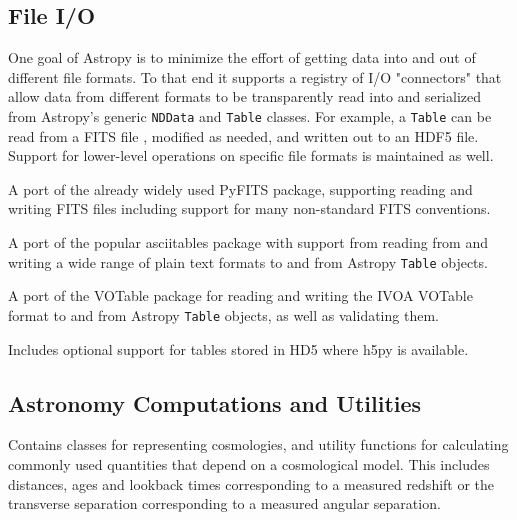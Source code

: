 \documentclass[11pt,twoside]{article}
\begin{document}
\subsection{File I/O}

One goal of Astropy is to minimize the effort of getting data into and out of
different file formats.  To that end it supports a registry of I/O "connectors"
that allow data from different formats to be transparently read into and
serialized from Astropy's generic \texttt{NDData} and \texttt{Table} classes.
For example, a \texttt{Table} can be read from a FITS file \citep{fits3},
modified as needed, and written out to an HDF5 file.  Support for lower-level
operations on specific file formats is maintained as well.


A port of the already widely used PyFITS \citep{barrett1999pyfits} package,
supporting reading and writing FITS files including support for many
non-standard FITS conventions.


A port of the popular asciitables package with support from reading from and
writing a wide range of plain text formats to and from Astropy \texttt{Table}
objects.


A port of the VOTable package for reading and writing the IVOA VOTable format
\citep{oschenbein2009votable} to and from Astropy \texttt{Table} objects, as
well as validating them.


Includes optional support for tables stored in HD5 where h5py is available.

\subsection{Astronomy Computations and Utilities}


Contains classes for representing cosmologies, and utility functions for
calculating commonly used quantities that depend on a cosmological model.  This
includes distances, ages and lookback times corresponding to a measured
redshift or the transverse separation corresponding to a measured angular
separation.

\end{document}
